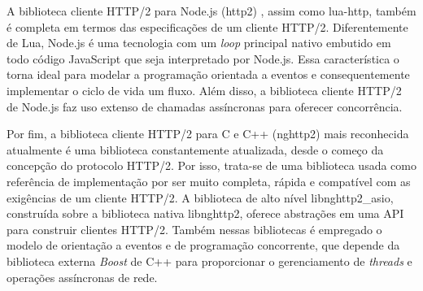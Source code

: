 A biblioteca cliente HTTP/2 para Node.js (http2) \cite{Nodejs}, assim como lua-http, também é completa em termos das especificações de um cliente HTTP/2. Diferentemente de Lua, Node.js é uma tecnologia com um {\em loop} principal nativo embutido em todo código JavaScript que seja interpretado por Node.js. Essa característica o torna ideal para modelar a programação orientada a eventos e consequentemente implementar o ciclo de vida um fluxo. Além disso, a biblioteca cliente HTTP/2 de Node.js faz uso extenso de chamadas assíncronas para oferecer concorrência.

Por fim, a biblioteca cliente HTTP/2 para C e C++ (nghttp2) \cite{nghttp2} mais reconhecida atualmente é uma biblioteca constantemente atualizada, desde o começo da concepção do protocolo HTTP/2. Por isso, trata-se de uma biblioteca usada como referência de implementação por ser muito completa, rápida e compatível com as exigências de um cliente HTTP/2. A biblioteca de alto nível libnghttp2\_asio, construída sobre a biblioteca nativa libnghttp2, oferece abstrações em uma API para construir clientes HTTP/2. Também nessas bibliotecas é empregado o modelo de orientação a eventos e de programação concorrente, que depende da biblioteca externa {\em Boost} de C++ para proporcionar o gerenciamento de {\em threads} e operações assíncronas de rede.